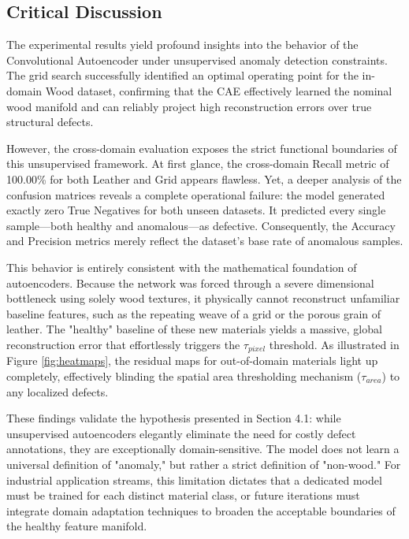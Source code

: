\documentclass[10pt,twocolumn,a4paper]{article}
\begin{document}
	
	\subsection{Critical Discussion}

The experimental results yield profound insights into the behavior of the Convolutional Autoencoder under unsupervised anomaly detection constraints. The grid search successfully identified an optimal operating point for the in-domain Wood dataset, confirming that the CAE effectively learned the nominal wood manifold and can reliably project high reconstruction errors over true structural defects.

However, the cross-domain evaluation exposes the strict functional boundaries of this unsupervised framework. At first glance, the cross-domain Recall metric of 100.00\% for both Leather and Grid appears flawless. Yet, a deeper analysis of the confusion matrices reveals a complete operational failure: the model generated exactly zero True Negatives for both unseen datasets. It predicted every single sample—both healthy and anomalous—as defective. Consequently, the Accuracy and Precision metrics merely reflect the dataset's base rate of anomalous samples.

This behavior is entirely consistent with the mathematical foundation of autoencoders. Because the network was forced through a severe dimensional bottleneck using solely wood textures, it physically cannot reconstruct unfamiliar baseline features, such as the repeating weave of a grid or the porous grain of leather. The "healthy" baseline of these new materials yields a massive, global reconstruction error that effortlessly triggers the $\tau_{pixel}$ threshold. As illustrated in Figure \ref{fig:heatmaps}, the residual maps for out-of-domain materials light up completely, effectively blinding the spatial area thresholding mechanism ($\tau_{area}$) to any localized defects.

These findings validate the hypothesis presented in Section 4.1: while unsupervised autoencoders elegantly eliminate the need for costly defect annotations, they are exceptionally domain-sensitive. The model does not learn a universal definition of "anomaly," but rather a strict definition of "non-wood." For industrial application streams, this limitation dictates that a dedicated model must be trained for each distinct material class, or future iterations must integrate domain adaptation techniques to broaden the acceptable boundaries of the healthy feature manifold.
\end{document}
